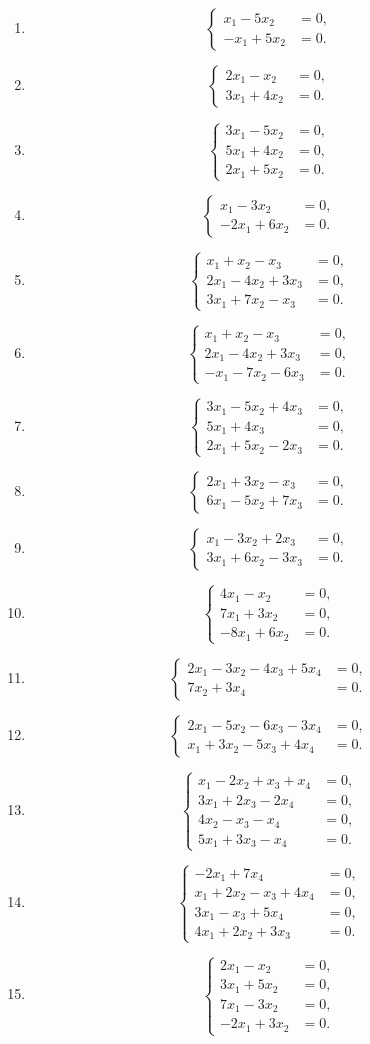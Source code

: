 \documentclass[12pt]{article}
\theoremstyle{remark}
\newcommand{\sistema}[1]{%
\[
\left\{
\begin{aligned}
#1
\end{aligned}
\right.
\]
}
\begin{document}
\begin{enumerate}[label=\textbf{H\arabic*.},leftmargin=*]
\item \sistema{x_1-5x_2&=0,\\-x_1+5x_2&=0.}
\item \sistema{2x_1-x_2&=0,\\3x_1+4x_2&=0.}
\item \sistema{3x_1-5x_2&=0,\\5x_1+4x_2&=0,\\2x_1+5x_2&=0.}
\item \sistema{x_1-3x_2&=0,\\-2x_1+6x_2&=0.}
\item \sistema{x_1+x_2-x_3&=0,\\2x_1-4x_2+3x_3&=0,\\3x_1+7x_2-x_3&=0.}
\item \sistema{x_1+x_2-x_3&=0,\\2x_1-4x_2+3x_3&=0,\\-x_1-7x_2-6x_3&=0.}
\item \sistema{3x_1-5x_2+4x_3&=0,\\5x_1+4x_3&=0,\\2x_1+5x_2-2x_3&=0.}
\item \sistema{2x_1+3x_2-x_3&=0,\\6x_1-5x_2+7x_3&=0.}
\item \sistema{x_1-3x_2+2x_3&=0,\\3x_1+6x_2-3x_3&=0.}
\item \sistema{4x_1-x_2&=0,\\7x_1+3x_2&=0,\\-8x_1+6x_2&=0.}
\item \sistema{2x_1-3x_2-4x_3+5x_4&=0,\\7x_2+3x_4&=0.}
\item \sistema{2x_1-5x_2-6x_3-3x_4&=0,\\x_1+3x_2-5x_3+4x_4&=0.}
\item \sistema{x_1-2x_2+x_3+x_4&=0,\\3x_1+2x_3-2x_4&=0,\\4x_2-x_3-x_4&=0,\\5x_1+3x_3-x_4&=0.}
\item \sistema{-2x_1+7x_4&=0,\\x_1+2x_2-x_3+4x_4&=0,\\3x_1-x_3+5x_4&=0,\\4x_1+2x_2+3x_3&=0.}
\item \sistema{2x_1-x_2&=0,\\3x_1+5x_2&=0,\\7x_1-3x_2&=0,\\-2x_1+3x_2&=0.}

\end{enumerate}
\end{document}
